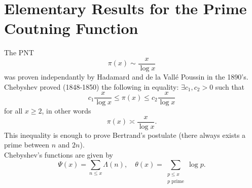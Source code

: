 \documentclass[12pt]{article}
\begin{document}
\section{Elementary Results for the Prime Coutning Function}
The PNT 
\[
    \pi(x)\sim\frac{x}{\log x}
\]
was proven independantly by Hadamard and de la Vall\'{e} Poussin in the 1890's. Chebyshev proved (1848-1850) the following in equality: $\exists c_1,c_2>0$ such that
\[
    c_1\frac{x}{\log x}\leq \pi(x)\leq c_2\frac{x}{\log x}    
\]
for all $x\geq 2$, in other words
\[
    \pi(x)\asymp\frac{x}{\log x}.
\]
This inequality is enough to prove Bertrand's postulate (there always exists a prime between $n$ and $2n$).\\
Chebyshev's functions are given by
\[
    \Psi(x)=\sum_{n\leq x}\Lambda(n),\quad \theta(x)=\sum_{\substack{p\leq x\\p \text{ prime}}}\log p.
\]
\end{document}

